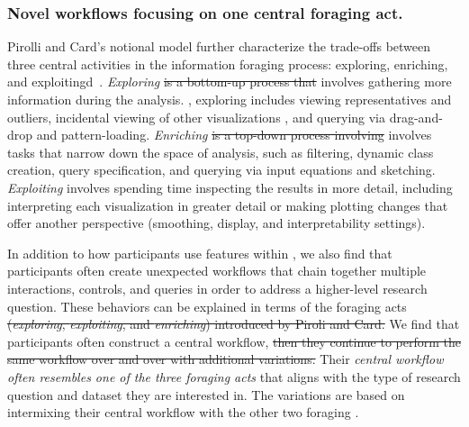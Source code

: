 \subsubsection{Novel workflows focusing on one central foraging act.}\label{novel_workflow_foraging}
\par Pirolli and Card's notional model further characterize the trade-offs between three central activities in the information foraging process: exploring, enriching, and exploitingd~\cite{Pirolli}. \textit{Exploring} \sout{is a bottom-up process that} involves gathering more information during the analysis. , exploring includes viewing representatives and outliers, incidental viewing of other visualizations , and querying via drag-and-drop and pattern-loading. \textit{Enriching} \sout{is a top-down process involving} involves tasks that narrow down the space of analysis, such as filtering, dynamic class creation, query specification, and querying via input equations and sketching. \textit{Exploiting} involves spending time inspecting the results in more detail, including interpreting each visualization in greater detail or making plotting changes that offer another perspective (smoothing, display, and interpretability settings). 
\par In addition to  how participants use features within , we also find that participants often create unexpected workflows that chain together multiple  interactions, controls, and queries in order to address a higher-level research question. These behaviors can be explained in terms of the foraging acts  \sout{(\textit{exploring}, \textit{exploiting}, and \textit{enriching}) introduced by Piroli and Card.} We find that participants often construct a central workflow,  \sout{then they continue to perform the same workflow over and over with additional variations.} Their \emph{central workflow often resembles one of the three foraging acts} that aligns with the type of research question and dataset they are interested in. The variations are based on intermixing their central workflow with the other two foraging .

